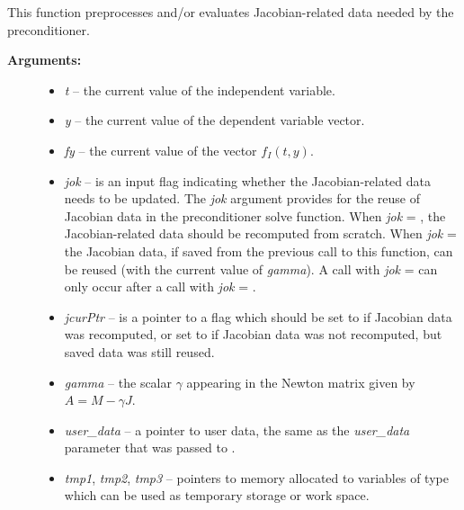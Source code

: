 \documentclass[letterpaper,10pt,english]{sphinxmanual}
\begin{document}
\begin{fulllineitems}
\label{c_interface/User_supplied:ARKSpilsPrecSetupFn}
This function preprocesses and/or evaluates Jacobian-related
data needed by the preconditioner.
\begin{description}
\item[{\textbf{Arguments:}}] \leavevmode\begin{itemize}
\item {} 
\emph{t} -- the current value of the independent variable.

\item {} 
\emph{y} -- the current value of the dependent variable vector.

\item {} 
\emph{fy} -- the current value of the vector $f_I(t,y)$.

\item {} 
\emph{jok} -- is an input flag indicating whether the Jacobian-related
data needs to be updated. The \emph{jok} argument provides for the
reuse of Jacobian data in the preconditioner solve function. When
\emph{jok} = , the Jacobian-related data should be recomputed
from scratch. When \emph{jok} =  the Jacobian data, if saved from the
previous call to this function, can be reused (with the current
value of \emph{gamma}). A call with \emph{jok} =  can only occur
after a call with \emph{jok} = .

\item {} 
\emph{jcurPtr} -- is a pointer to a flag which should be set to
 if Jacobian data was recomputed, or set to  if
Jacobian data was not recomputed, but saved data was still reused.

\item {} 
\emph{gamma} -- the scalar $\gamma$ appearing in the Newton
matrix given by $A=M-\gamma J$.

\item {} 
\emph{user\_data} -- a pointer to user data, the same as the
\emph{user\_data} parameter that was passed to {\hyperref[c_interface/User_callable:ARKodeSetUserData]{}}.

\item {} 
\emph{tmp1}, \emph{tmp2}, \emph{tmp3} -- pointers to memory allocated to
variables of type  which can be used as temporary
storage or work space.


\end{itemize}
\end{description}
\end{fulllineitems}
\end{document}
